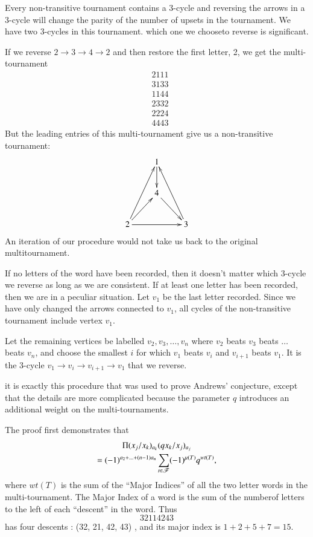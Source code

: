 Every non-transitive tournament contains a 3-cycle and reversing the arrows in a 3-cycle will change the parity of the number of upsets in the tournament. We have two 3-cycles in this tournament. which one we choose\pageoriginale to reverse is significant. 

If we reverse $2 \to 3 \to 4 \to 2$ and then restore the first letter, 2, we get the multi-tournament
\begin{align*}
&2111\\
&3133\\
&1144\\
&2332\\
&2224\\
&4443
\end{align*}
But the leading entries of this multi-tournament give us a non-transitive tournament:
$$
\xymatrix{
& 1\ar[d] & \\
& 4 \ar[dr] & \\
2\ar[uur] \ar[ur]\ar[rr] & & 3 \ar[uul]
}
$$
An iteration of our procedure would not take us back to the original multitournament.

If no letters of the word have been recorded, then it doesn't matter which 3-cycle we reverse as long as we are consistent. If at least one letter has been recorded, then we are in a peculiar situation. Let $v_1$ be the last letter recorded. Since we have only changed the arrows connected to $v_1$, all cycles of the non-transitive tournament include vertex $v_1$.

Let the remaining vertices be labelled $v_2, v_3, \ldots, v_n$ where $v_2$ beats $v_3$ beats $\ldots$ beats $v_n$, and choose the smallest $i$ for which $v_1$ beats $v_i$ and $v_{i+1}$ beats $v_1$. It is the 3-cycle $v_1 \to v_i \to v_{i+1} \to v_1$ that we reverse.

it is exactly this procedure that was used to prove Andrews' conjecture, except that the details are more complicated because the parameter $q$ introduces an additional weight on the multi-tournaments. 

The proof first demonstrates that
\begin{gather}
[x^0] \Pi (x_j/x_k)_{a_k} (qx_k/x_j)_{a_j}\\
= (-1)^{a_2 + \ldots + (n-1) a_n} \sum\limits_{t \in \sF} (-1)^{\mu(T)} q^{wt (T)},
\label{art4-eq12}
\end{gather}
where $wt (T)$ is the sum of the ``Major Indices'' of all the two letter words in the multi-tournament. The Major Index of a word is the sum of the number\pageoriginale of letters to the left of each ``descent'' in the word. Thus
$$
32114243
$$
has four descents : (32, 21, 42, 43) , and its major index is $1+2+5+7=15$. 

